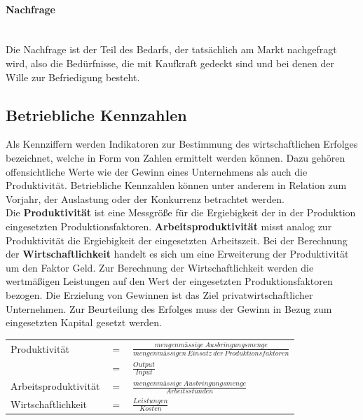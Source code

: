 \paragraph{Nachfrage}~\\
Die Nachfrage ist der Teil des Bedarfs, der tatsächlich am Markt nachgefragt wird, also die Bedürfnisse, die mit Kaufkraft gedeckt sind und bei denen der Wille zur Befriedigung besteht.
	

\subsection{Betriebliche Kennzahlen}

Als Kennziffern werden Indikatoren zur Bestimmung des wirtschaftlichen Erfolges bezeichnet, welche in Form von Zahlen ermittelt werden können. Dazu gehören offensichtliche Werte wie der Gewinn eines Unternehmens als auch die Produktivität. Betriebliche Kennzahlen können unter anderem in Relation zum Vorjahr, der Auslastung oder der Konkurrenz betrachtet werden.\\

Die {\bf Produktivität} ist eine Messgröße für die Ergiebigkeit der in der Produktion eingesetzten Produktionsfaktoren. {\bf Arbeitsproduktivität} misst analog zur Produktivität die Ergiebigkeit der eingesetzten Arbeitszeit. Bei der Berechnung der {\bf Wirtschaftlichkeit} handelt es sich um eine Erweiterung der Produktivität um den Faktor Geld. Zur Berechnung der Wirtschaftlichkeit werden die wertmäßigen Leistungen auf den Wert der eingesetzten Produktionsfaktoren bezogen. Die Erzielung von Gewinnen ist das Ziel privatwirtschaftlicher Unternehmen. Zur Beurteilung des Erfolges muss der Gewinn in Bezug zum eingesetzten Kapital gesetzt werden.\\

\begin{tabular}{lll}
Produktivität & $=$ & $\frac{mengenmässige\ Ausbringungsmenge}{mengenmässigen\ Einsatz\ der\ Produktionsfaktoren}$\\
& $=$ & $\frac{Output}{Input}$\\
Arbeitsproduktivität & $=$ & $ \frac{mengenmässige\ Ausbringungsmenge}{Arbeitsstunden}$\\
Wirtschaftlichkeit & $=$ & $\frac{Leistungen}{Kosten}$\\
\end{tabular}\\\\
 
